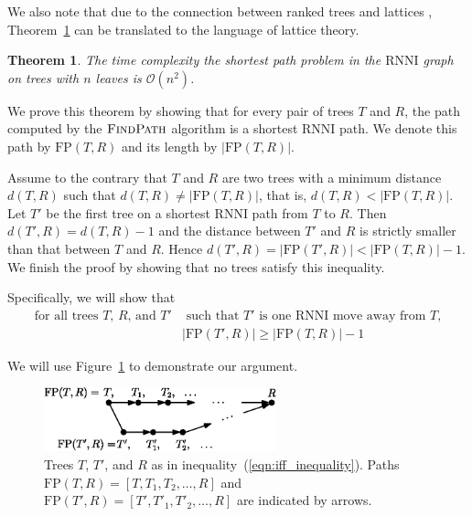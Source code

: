 \documentclass[11pt]{amsart}
\newtheorem{theorem}{Theorem}
\newcommand{\rnni}{\mathrm{RNNI}}
\newcommand{\findpath}{\textsc{FindPath}}
\newcommand{\fp}{\mathrm{FP}}
\renewcommand{\O}{\mathcal O}
\begin{document}
We also note that due to the connection between ranked trees and lattices \autocite{Collienne2019-ca}, Theorem~\ref{thm:rnni_polynomial} can be translated to the language of lattice theory.

\begin{theorem}
The time complexity the shortest path problem in the $\rnni$ graph on trees with $n$ leaves is $\O(n^2)$.
\label{thm:rnni_polynomial}
\end{theorem}

\proof
We prove this theorem by showing that for every pair of trees $T$ and $R$, the path computed by the $\findpath$ algorithm is a shortest $\rnni$ path.
We denote this path by $\fp(T, R)$ and its length by $|\fp(T, R)|$.

Assume to the contrary that $T$ and $R$ are two trees with a minimum distance $d(T, R)$ such that $d(T,R) \neq |\fp(T,R)|$, that is, $d(T,R) < |\fp(T,R)|$.
Let $T'$ be the first tree on a shortest $\rnni$ path from $T$ to $R$.
Then $d(T',R) = d(T, R) - 1$ and the distance between $T'$ and $R$ is strictly smaller than that between $T$ and $R$.
Hence $d(T', R) = |\fp(T',R)| < |\fp(T,R)| - 1$.
We finish the proof by showing that no trees satisfy this inequality.

Specifically, we will show that
\begin{equation}
\begin{split}
\mbox{for all trees $T$, $R$, and $T'$}	& \mbox{ such that $T'$ is one $\rnni$ move away from $T$,}\\
					&|\fp(T',R)| \geq |\fp(T,R)| - 1
\end{split}
 \label{eqn:iff_inequality}
\end{equation}

We will use Figure~\ref{fig:proof_idea} to demonstrate our argument.

\begin{figure}[ht]
\centering
\includegraphics[width=0.6\textwidth]{proof_idea_ag}
\caption{Trees $T$, $T'$, and $R$ as in inequality~(\ref{eqn:iff_inequality}).
Paths $\fp(T,R) = [T,T_1,T_2, \ldots, R]$ and $\fp(T',R) = [T',T'_1,T'_2, \ldots, R]$ are indicated by arrows.}
\label{fig:proof_idea}
\end{figure}
\end{document}
